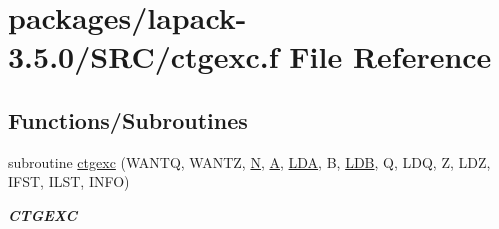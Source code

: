 \hypertarget{ctgexc_8f}{}\section{packages/lapack-\/3.5.0/\+S\+R\+C/ctgexc.f File Reference}
\label{ctgexc_8f}
\subsection*{Functions/\+Subroutines}
\begin{DoxyCompactItemize}
\item 
subroutine \hyperlink{group__complexGEcomputational_ga940fe176c0f222043756578707ac989c}{ctgexc} (W\+A\+N\+T\+Q, W\+A\+N\+T\+Z, \hyperlink{polmisc_8c_a0240ac851181b84ac374872dc5434ee4}{N}, \hyperlink{classA}{A}, \hyperlink{example__user_8c_ae946da542ce0db94dced19b2ecefd1aa}{L\+D\+A}, B, \hyperlink{example__user_8c_a50e90a7104df172b5a89a06c47fcca04}{L\+D\+B}, Q, L\+D\+Q, Z, L\+D\+Z, I\+F\+S\+T, I\+L\+S\+T, I\+N\+F\+O)
\begin{DoxyCompactList}\small\item\em {\bfseries C\+T\+G\+E\+X\+C} \end{DoxyCompactList}\end{DoxyCompactItemize}
